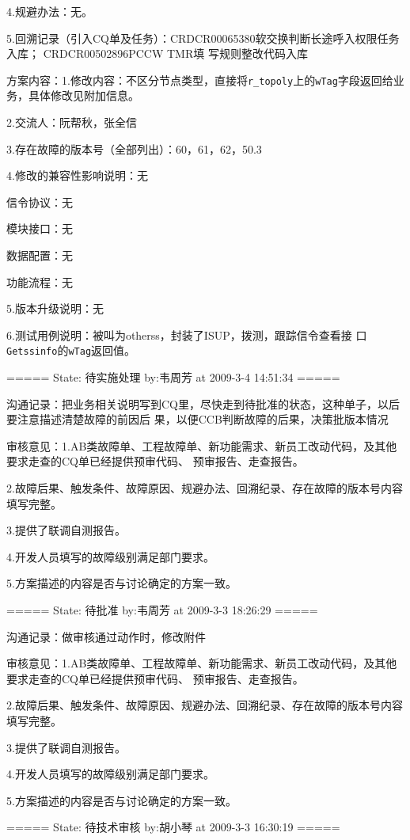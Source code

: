 \documentclass[12pt,a4paper,onecolumn]{article}
\begin{document}
4.规避办法：无。

5.回溯记录（引入CQ单及任务）：CRDCR00065380软交换判断长途呼入权限任务入库； CRDCR00502896PCCW TMR填
写规则整改代码入库

方案内容：1.修改内容：不区分节点类型，直接将\lstinline{r_topoly}上的\lstinline{wTag}字段返回给业
务，具体修改见附加信息。

2.交流人：阮帮秋，张全信

3.存在故障的版本号（全部列出）：60，61，62，50.3

4.修改的兼容性影响说明：无

信令协议：无

模块接口：无

数据配置：无

功能流程：无

5.版本升级说明：无

6.测试用例说明：被叫为otherss，封装了ISUP，拨测，跟踪信令查看接
口\lstinline{Getssinfo}的\lstinline{wTag}返回值。


===== State: 待实施处理 by:韦周芳 at 2009-3-4 14:51:34 =====

沟通记录：把业务相关说明写到CQ里，尽快走到待批准的状态，这种单子，以后要注意描述清楚故障的前因后
果，以便CCB判断故障的后果，决策批版本情况

审核意见：1.AB类故障单、工程故障单、新功能需求、新员工改动代码，及其他要求走查的CQ单已经提供预审代码、
预审报告、走查报告。

2.故障后果、触发条件、故障原因、规避办法、回溯纪录、存在故障的版本号内容填写完整。

3.提供了联调自测报告。

4.开发人员填写的故障级别满足部门要求。

5.方案描述的内容是否与讨论确定的方案一致。


===== State: 待批准 by:韦周芳 at 2009-3-3 18:26:29 =====

沟通记录：做审核通过动作时，修改附件 


审核意见：1.AB类故障单、工程故障单、新功能需求、新员工改动代码，及其他要求走查的CQ单已经提供预审代码、
预审报告、走查报告。

2.故障后果、触发条件、故障原因、规避办法、回溯纪录、存在故障的版本号内容填写完整。

3.提供了联调自测报告。

4.开发人员填写的故障级别满足部门要求。

5.方案描述的内容是否与讨论确定的方案一致。

===== State: 待技术审核 by:胡小琴 at 2009-3-3 16:30:19 =====
\end{document}
